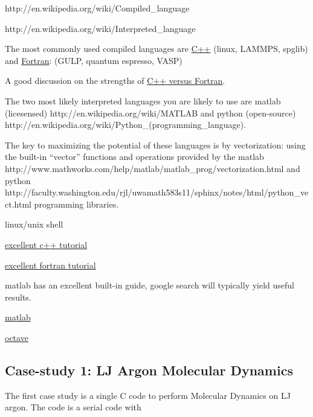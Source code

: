http://en.wikipedia.org/wiki/Compiled_language

http://en.wikipedia.org/wiki/Interpreted_language

The most commonly used compiled languages are 
\href{https://en.wikipedia.org/wiki/C\%2B\%2B}{C++} 
(linux, LAMMPS, spglib) 
and 
\href{http://en.wikipedia.org/wiki/Fortran}{Fortran}: 
(GULP, quantum espresso, VASP)

A good discussion on the strengths of 
\href{http://stackoverflow.com/questions/13078736/fortran-vs-c-does-fortran-still-hold-any-advantage-in-numerical-analysis-thes}
{C++ versus Fortran}.

The two most likely interpreted languages you are likely to use are 
matlab (licesensed) http://en.wikipedia.org/wiki/MATLAB 
and 
python (open-source) http://en.wikipedia.org/wiki/Python_(programming_language).



The key to maximizing the potential of these languages is by vectorization: 
using the built-in ``vector'' functions and operations provided by the 
matlab http://www.mathworks.com/help/matlab/matlab_prog/vectorization.html 
and 
python http://faculty.washington.edu/rjl/uwamath583s11/sphinx/notes/html/python_vect.html 
programming libraries.



linux/unix shell

\href{http://www.youtube.com/watch?v=XFQ9dw3CyDo&list=PL1D10C030FDCE7CE0}
{excellent c++ tutorial}



\href{http://www.youtube.com/watch?v=YRTEOFMUTzw&list=PL6A8E21D2E86A0155}
{excellent fortran tutorial}

matlab has an excellent built-in guide, google search will typically 
yield useful results. 

\href{http://www.gnu.org/software/octave/}
{matlab}

\href{http://www.gnu.org/software/octave/}
{octave}

\subsection{Case-study 1: LJ Argon Molecular Dynamics}

The first case study is a single C code to perform Molecular Dynamics 
on LJ argon. The code is a serial code with 

